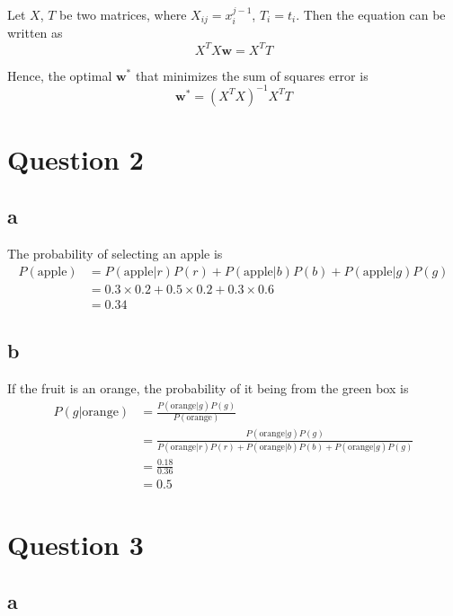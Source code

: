 \documentclass[a4paper,12pt]{article}
\begin{document}
Let $X$, $T$ be two matrices, where $X_{ij} = x_i^{j-1}$, $T_i = t_i$. Then the equation can be written as
\begin{equation*}
	X^T X \mathbf{w} = X^T T
\end{equation*}

Hence, the optimal $\mathbf{w}^*$ that minimizes the sum of squares error is
\begin{equation*}
	\mathbf{w}^* = (X^T X)^{-1} X^T T
\end{equation*}

\section*{Question 2}

\subsection*{a}

The probability of selecting an apple is
\begin{align*}
	P(\text{apple}) &= P(\text{apple} | r) P(r) + P(\text{apple} | b) P(b) + P(\text{apple} | g) P(g) \\
	&= 0.3 \times 0.2 + 0.5 \times 0.2 + 0.3 \times 0.6 \\
	&= 0.34
\end{align*}

\subsection*{b}

If the fruit is an orange, the probability of it being from the green box is
\begin{align*}
	P(g | \text{orange}) &= \frac{P(\text{orange} | g) P(g)}{P(\text{orange})} \\
	&= \frac{P(\text{orange} | g) P(g)}{P(\text{orange} | r) P(r) + P(\text{orange} | b) P(b) + P(\text{orange} | g) P(g)} \\
	&= \frac{0.18}{0.36} \\
	&= 0.5
\end{align*}

\section*{Question 3}

\subsection*{a}
\end{document}
